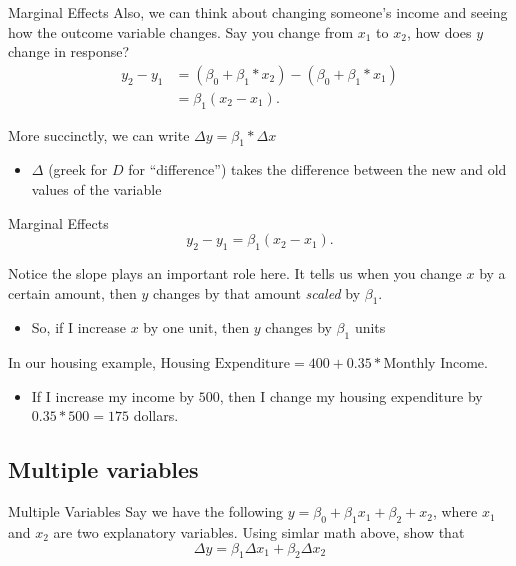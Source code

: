 \documentclass[aspectratio=169,t,11pt,table]{beamer}
\begin{document}
\begin{frame}{Marginal Effects}
  Also, we can think about changing someone's income and seeing how the outcome variable changes. Say you change from $x_1$ to $x_2$, how does $y$ change in response?
  \begin{align*}
    y_2 - y_1 
    &= (\beta_0 + \beta_1 * x_2) - (\beta_0 + \beta_1 * x_1) \\
    &= \beta_1 (x_2 - x_1).
  \end{align*}

  \pause
  \bigskip
  More succinctly, we can write $\Delta y = \beta_1 * \Delta x$
  \begin{itemize}
    \item $\Delta$ (greek for $D$ for ``difference'') takes the difference between the new and old values of the variable
  \end{itemize}
\end{frame}

\begin{frame}{Marginal Effects}
  \vspace*{-2\bigskipamount}
  $$
    y_2 - y_1  = \beta_1 (x_2 - x_1).
  $$

  Notice the slope plays an important role here. It tells us when you change $x$ by a certain amount, then $y$ changes by that amount \emph{scaled} by $\beta_1$. 
  \begin{itemize}
    \item So, if I increase $x$ by one unit, then $y$ changes by $\beta_1$ units
  \end{itemize}

  \pause
  \bigskip
  In our housing example, $\text{Housing Expenditure} = 400 + 0.35 * \text{Monthly Income}$. 
  \begin{itemize}
    \item If I increase my income by $500$, then I change my housing expenditure by $0.35 * 500 = 175$ dollars.
  \end{itemize}
\end{frame}


\subsection*{Multiple variables}

\begin{frame}{Multiple Variables}
  Say we have the following $y = \beta_0 + \beta_1 x_1 + \beta_2 + x_2$, where $x_1$ and $x_2$ are two explanatory variables. Using simlar math above, show that 
  $$
    \Delta y = \beta_1 \Delta x_1 + \beta_2 \Delta x_2
  $$
\end{frame}
\end{document}
